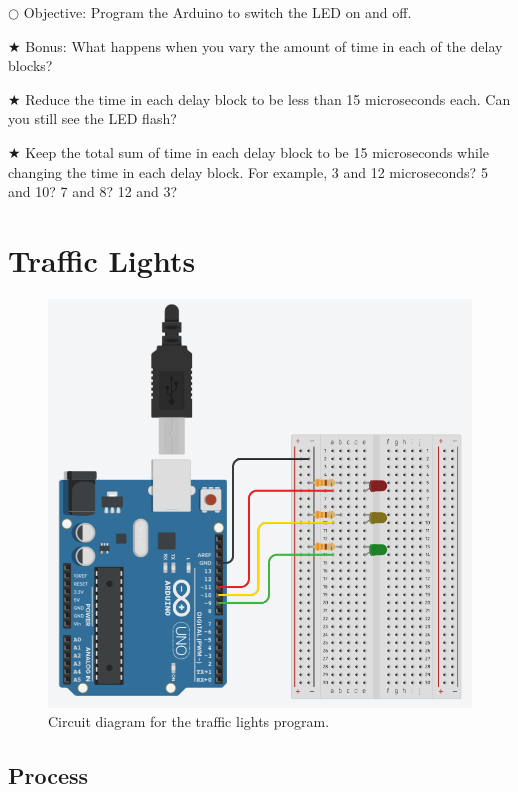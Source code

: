 \documentclass[12pt]{article}
\begin{document}
	\noindent $\bigcirc$ Objective: Program the Arduino to switch the LED on and off.
	
	\noindent $\bigstar$ Bonus: What happens when you vary the amount of time in each of the delay blocks?
	
	\indent $\bigstar$ Reduce the time in each delay block to be less than 15 microseconds each. Can you still see the LED flash?
	
	\indent $\bigstar$ Keep the total sum of time in each delay block to be 15 microseconds while changing the time in each delay block. For example, 3 and 12 microseconds? 5 and 10? 7 and 8? 12 and 3?
	
	
	
	
	
	
	\section{Traffic Lights}
	
	\begin{figure}[H]
		\begin{center}
			\includegraphics[scale=0.5]{traffic_light}
			\caption{Circuit diagram for the traffic lights program.}
			\label{fig:circuit_traffic_light}
		\end{center}
	\end{figure}
	
	\subsection{Process}
	
\end{document}

